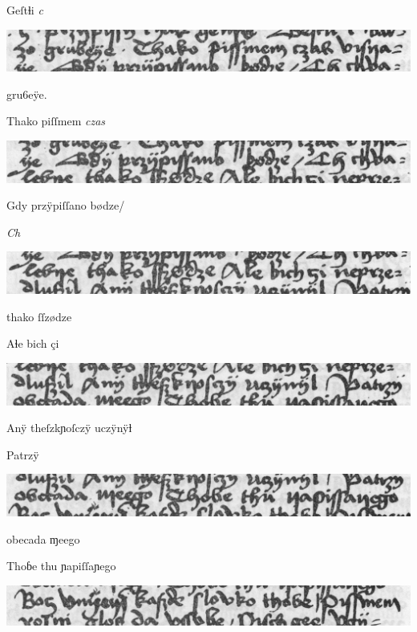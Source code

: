 \indentVerse Geſtɬi \textit{c}  

\includegraphics[width=\hsize]{wierszP17}

\newverseline {} gru6eÿe.

\indentVerse Thako piſſmem \textit{czas} 

\includegraphics[width=\hsize]{wierszP18}

\newverseline {} Gdy  przÿpiſſano bødze/

\indentVerse \textit{Ch}  

\newpage

\includegraphics[width=\hsize]{wierszP19}

\splitverse

 thako ſſzødze

\indentVerse Aɬe bich çi 

\includegraphics[width=\hsize]{wierszP20}

\splitverse


\indentVerse Anÿ theſzkɲoſczÿ uczÿnÿƚ

\indentVerse Patrzÿ 

\includegraphics[width=\hsize]{wierszP21}

\splitverse

obecada ɱeego

\indentVerse Thoɓe thu ɲapiſſaɲego 

\includegraphics[width=\hsize]{wierszP22}

